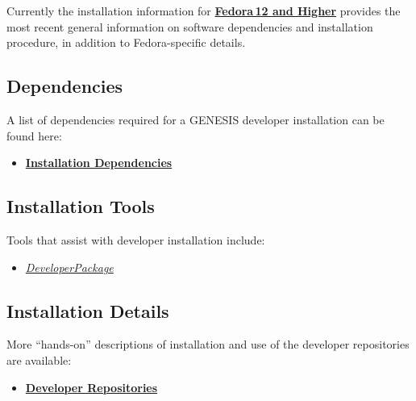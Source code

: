 \documentclass[12pt]{article}
\begin{document}
Currently the installation information for
\href{../installation-fedora12/installation-fedora12.tex} {\bf
  Fedora\,12 and Higher} provides the most recent general information
on software dependencies and installation procedure, in addition to
Fedora-specific details.

\subsection*{Dependencies}
A list of dependencies required for a GENESIS developer installation can be found here:
\begin{itemize}
   \item[]\href{../genesis-dependencies/genesis-dependencies.tex}{\bf Installation Dependencies}
\end{itemize}

\subsection*{Installation Tools}
Tools that assist with developer installation include:
\begin{itemize}
   \item[]\href{../developer-package/developer-package.tex}{\it DeveloperPackage}
\end{itemize}

\subsection*{Installation Details}
More ``hands-on'' descriptions of installation and use of the developer repositories are available:
\begin{itemize}
   \item[]\href{../developer-repository/developer-repository.tex}{\bf Developer Repositories}
\end{itemize}
\end{document}

